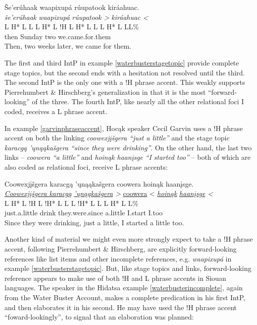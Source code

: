 \documentclass[output=paper]{LSP/langsci}
\begin{document}
\ea\label{waterbusterstagetopic}
Še’erúhaak waapixupá rúupatook kiráahuac.\footnotemark\\
\glll	\emph{še’erúhaak}		\emph{waapixupá}		\emph{rúupatook >	}	\emph{kiráahuac <}\\
	{\ob L H* L L\cb}		{\ob L H* L !H\cb}		{\ob L H* L L\cb}		{\ob L H* L L\cb{}L\%}\\
	then				Sunday			two				we.came.for.them\\
\glt	Then, two weeks later, we came for them.
\z

The first and third IntP in example \ref{waterbusterstagetopic} provide complete stage topics, but the second ends with a hesitation not resolved until the third. The second IntP is the only one with a !H phrase accent. This weakly supports Pierrehumbert \& Hirschberg’s generalization in that it is the most “forward-looking” of the three. The fourth IntP, like nearly all the other relational foci I coded, receives a L phrase accent.

In example \ref{garvinphraseaccent}, Hocąk speaker Cecil Garvin uses a !H phrase accent on both the linking \emph{coowexjįšgera “just a little”} and the stage topic \emph{karacgą ’ųnąąkašgera “since they were drinking”}. On the other hand, the last two links -- \emph{coowera “a little”} and \emph{hoinąk	haanįsge “I started too”} -- both of which are also coded as relational foci, receive L phrase accents:

\ea\label{garvinphraseaccent}
 	Coowexjįšgera karacgą ’ųnąąkašgera coowera hoinąk haanįsge.\footnotemark\\
\glll	\emph{\underline{Coowexjįšgera	}}	\emph{\underline{karacgą}}	\emph{\underline{’ųnąąkašgera}	>}	{\underline{coowera} <}	\emph{\underline{hoinąk}}	\emph{\underline{haanįsge} <}\\
	{\ob L H* L !H\cb}				{\ob L !H* L}				{L\cb}	{\ob L !H* L L\cb}		{\ob L H* L}						{\hspaceThis{haanįs}\ob{}L\%}\\
	just.a.little					drink					they.were.since				a.little				I.start						I.too\\
\glt	Since they were drinking, just a little, I started a little too.
\z

Another kind of material we might even more strongly expect to take a !H phrase accent, following Pierrehumbert \& Hirschberg, are explicitly forward-looking references like list items and other incomplete references, e.g. \emph{waapixupá} in example \ref{waterbusterstagetopic}. But, like stage topics and links, forward-looking reference appears to make use of both !H and L phrase accents in Siouan languages. The speaker in the Hidatsa example \ref{waterbusterincomplete}, again from the Water Buster Account, makes a complete predication in his first IntP, and then elaborates it in his second. He may have used the !H phrase accent “foward-lookingly”, to signal that an elaboration was planned:
\end{document}
